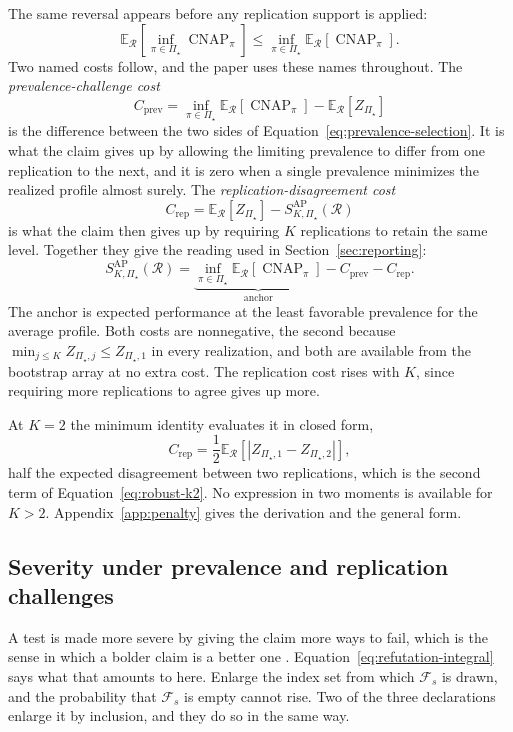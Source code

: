 \documentclass[11pt]{article}
\newcommand{\CNAP}{\operatorname{CNAP}}
\newcommand{\Regime}{\mathcal{R}}
\newcommand{\PSet}{\Pi_\star}
\newcommand{\E}{\mathbb{E}}
\newcommand{\SRob}{S_{K,\PSet}^{\mathrm{AP}}(\Regime)}
\newcommand{\RefSet}{\mathcal{F}}
\theoremstyle{remark}
\begin{document}
The same reversal appears before any replication support is applied:
\begin{equation}
\E_{\Regime}
\left[
\inf_{\pi\in\PSet}\CNAP_\pi
\right]
\leq
\inf_{\pi\in\PSet}
\E_{\Regime}
\left[
\CNAP_\pi
\right].
\label{eq:prevalence-selection}
\end{equation}
Two named costs follow, and the paper uses these names throughout. The \emph{prevalence-challenge cost}
\[
C_{\mathrm{prev}}
=
\inf_{\pi\in\PSet}\E_{\Regime}[\CNAP_\pi]
-
\E_{\Regime}[Z_{\PSet}]
\]
is the difference between the two sides of Equation~\eqref{eq:prevalence-selection}. It is what the claim gives up by allowing the limiting prevalence to differ from one replication to the next, and it is zero when a single prevalence minimizes the realized profile almost surely. The \emph{replication-disagreement cost}
\[
C_{\mathrm{rep}}
=
\E_{\Regime}\left[Z_{\PSet}\right]
-
\SRob
\]
is what the claim then gives up by requiring $K$ replications to retain the same level. Together they give the reading used in Section~\ref{sec:reporting}:
\begin{equation}
\SRob
=
\underbrace{\inf_{\pi\in\PSet}\E_{\Regime}[\CNAP_\pi]}_{\text{anchor}}
-
C_{\mathrm{prev}}
-
C_{\mathrm{rep}}.
\label{eq:two-costs}
\end{equation}
The anchor is expected performance at the least favorable prevalence for the average profile. Both costs are nonnegative, the second because $\min_{j\leq K}Z_{\PSet,j}\leq Z_{\PSet,1}$ in every realization, and both are available from the bootstrap array at no extra cost. The replication cost rises with $K$, since requiring more replications to agree gives up more.

At $K=2$ the minimum identity evaluates it in closed form,
\[
C_{\mathrm{rep}}
=
\frac12
\E_{\Regime}
\left[
|Z_{\PSet,1}-Z_{\PSet,2}|
\right],
\]
half the expected disagreement between two replications, which is the second term of Equation~\eqref{eq:robust-k2}. No expression in two moments is available for $K>2$. Appendix~\ref{app:penalty} gives the derivation and the general form.

\subsection{Severity under prevalence and replication challenges}
\label{sec:severity}

A test is made more severe by giving the claim more ways to fail, which is the sense in which a bolder claim is a better one \cite{popper1963conjectures}. Equation~\eqref{eq:refutation-integral} says what that amounts to here. Enlarge the index set from which $\RefSet_s$ is drawn, and the probability that $\RefSet_s$ is empty cannot rise. Two of the three declarations enlarge it by inclusion, and they do so in the same way.
\end{document}
